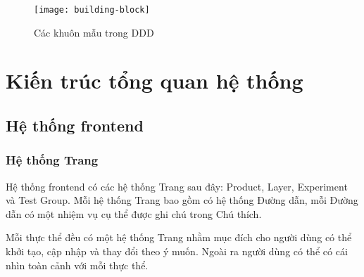 \begin{figure}[H]
	\centering
	\texttt{[image: building-block]}
	\caption{Các khuôn mẫu trong DDD}
\end{figure}

\section{Kiến trúc tổng quan hệ thống}

\subsection{Hệ thống frontend}

\subsubsection{Hệ thống Trang}

Hệ thống frontend có các hệ thống Trang sau đây: Product, Layer, Experiment và Test Group. Mỗi hệ thống Trang bao gồm có hệ thống Đường dẫn, mỗi Đường dẫn có một nhiệm vụ cụ thể được ghi chú trong Chú thích.

Mỗi thực thể đều có một hệ thống Trang nhằm mục đích cho người dùng có thể khởi tạo, cập nhập và thay đổi theo ý muốn. Ngoài ra người dùng có thể có cái nhìn toàn cảnh với mỗi thực thể.

